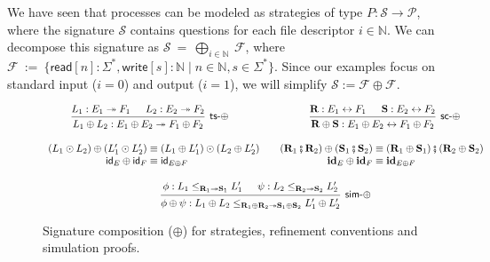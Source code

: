\documentclass[acmsmall,nonacm]{acmart}
\newcommand{\kw}[1]{\ensuremath{ \mathsf{#1} }}
\newcommand{\idsc}{\mathbf{id}} %
\newcommand{\vcomp}{\fatsemi}
\begin{document}
\begin{example}
We have seen that processes can be modeled as
strategies of type $P : \mathcal{S} \rightarrow \mathcal{P}$,
where the signature $\mathcal{S}$ contains questions for
each file descriptor $i \in \mathbb{N}$.
We can decompose this signature as
$
  \mathcal{S} \: = \: \bigoplus_{i \in \mathbb{N}} \: \mathcal{F}
$, where $
  \mathcal{F} \: := \:
    \{ \kw{read}[n] : \Sigma^*, \kw{write}[s] : \mathbb{N} \mid n \in \mathbb{N}, s \in \Sigma^* \}
$.
Since our examples focus on standard input ($i=0$) and output ($i=1$),
we will simplify $\mathcal{S} := \mathcal{F} \oplus \mathcal{F}$.
\end{example}

\begin{figure} %
  \begin{gather*}
    \begin{prooftree}
      \hypo{L_1 : E_1 \twoheadrightarrow F_1}
      \hypo{L_2 : E_2 \twoheadrightarrow F_2}
      \infer2[\kw{ts}-$\oplus$]{
        L_1 \oplus L_2 : E_1 \oplus E_2 \twoheadrightarrow F_1 \oplus F_2}
    \end{prooftree}
    \hspace{8em}
    \begin{prooftree}
      \hypo{\mathbf{R} : E_1 \leftrightarrow F_1}
      \hypo{\mathbf{S} : E_2 \leftrightarrow F_2}
      \infer2[\kw{sc}-$\oplus$]{
        \mathbf{R} \oplus \mathbf{S} : E_1 \oplus E_2 \leftrightarrow F_1 \oplus F_2
      }
    \end{prooftree}
    \\[1em]
    \begin{array}{r@{}l}
      (L_1 \odot L_2) \oplus (L_1' \odot L_2') & {} \equiv
      (L_1 \oplus L_1') \odot (L_2 \oplus L_2') \\
      \kw{id}_E \oplus \kw{id}_F & {} \equiv \kw{id}_{E \oplus F}
    \end{array}
    \quad
    \begin{array}{r@{}l}
      (\mathbf{R}_1 \vcomp \mathbf{R}_2) \oplus (\mathbf{S}_1 \vcomp \mathbf{S}_2)
      & {} \equiv
      (\mathbf{R}_1 \oplus \mathbf{S}_1) \vcomp (\mathbf{R}_2 \oplus \mathbf{S}_2)
      \\
      \idsc_E \oplus \idsc_F & {} \equiv \idsc_{E \oplus F}
    \end{array}
    \\[1em]
    \begin{prooftree}
      \hypo{\phi: L_1 \le_{\mathbf{R}_1 \twoheadrightarrow \mathbf{S}_1} L_1'}
      \hypo{\psi: L_2 \le_{\mathbf{R}_2 \twoheadrightarrow \mathbf{S}_2} L_2'}
      \infer2[\kw{sim}-$\oplus$]{\phi \oplus \psi :
	L_1 \oplus L_2
        \le_{\mathbf{R}_1 \oplus \mathbf{R}_2 \twoheadrightarrow
             \mathbf{S}_1 \oplus \mathbf{S}_2}
	L_1' \oplus L_2'}
    \end{prooftree}
  \end{gather*}
  \caption{Signature composition ($\oplus$) for strategies,
    refinement conventions and simulation proofs.}
  \label{fig:fcomp}
\end{figure}
\end{document}
